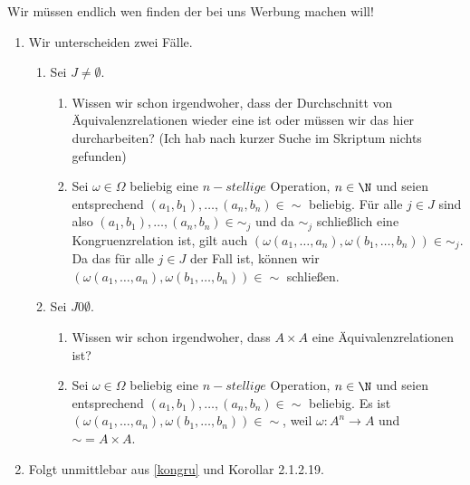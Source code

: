 \begin{solution} 
    Wir müssen endlich wen finden der bei uns Werbung machen will!
    \begin{enumerate}[label = \alph*)]
        \item Wir unterscheiden zwei Fälle.
        \begin{enumerate}[label = Fall \arabic*:]
            \item Sei $J \neq \emptyset$.
            \begin{enumerate}[label = (\roman*)]
                \item Wissen wir schon irgendwoher, dass der Durchschnitt von Äquivalenzrelationen wieder eine ist oder müssen wir das hier durcharbeiten? (Ich hab nach kurzer Suche im Skriptum nichts gefunden)
                \item Sei $\omega \in \Omega$ beliebig eine $n-stellige$ Operation, $n \in \N$ und seien entsprechend $(a_1, b_1), \dots, (a_n, b_n) \in \sim$ beliebig. Für alle $j \in J$ sind also $(a_1, b_1), \dots, (a_n, b_n) \in \sim_j$ und da $\sim_j$ schließlich eine Kongruenzrelation ist, gilt auch $(\omega(a_1, \dots, a_n), \omega(b_1, \dots, b_n)) \in \sim_j$. Da das für alle $j \in J$ der Fall ist, können wir $(\omega(a_1, \dots, a_n), \omega(b_1, \dots, b_n)) \in \sim$ schließen. 
            \end{enumerate}
            \item Sei $J 0\emptyset$.
            \begin{enumerate}[label = (\roman*)]
                \item Wissen wir schon irgendwoher, dass $A \times A$ eine Äquivalenzrelationen ist?
                \item Sei $\omega \in \Omega$ beliebig eine $n-stellige$ Operation, $n \in \N$ und seien entsprechend $(a_1, b_1), \dots, (a_n, b_n) \in \sim$ beliebig. Es ist $(\omega(a_1, \dots, a_n), \omega(b_1, \dots, b_n)) \in \sim$, weil $\omega: A^n \to A$ und $\sim = A \times A$.
            \end{enumerate}
        \end{enumerate}
        \item Folgt unmittlebar aus \ref{kongru} und Korollar 2.1.2.19. 
    \end{enumerate}
\end{solution}